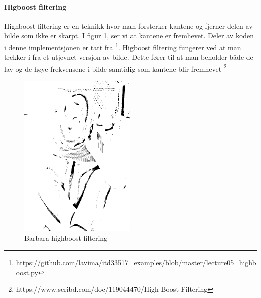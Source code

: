 \documentclass[a4paper, 12pt]{article}
\begin{document}
\paragraph{Higboost filtering}
Highboost filtering er en teknikk hvor man forsterker kantene og fjerner delen av bilde som ikke er skarpt. I figur \ref{fig:highboost-filtering}, ser vi at kantene er fremhevet. Deler av koden i denne implementsjonen er tatt fra \footnote{https://github.com/lavima/itd33517\_examples/blob/master/lecture05\_highboost.py}. Higboost filtering fungerer ved at man trekker i fra et utjevnet versjon av bilde. Dette fører til at man beholder både de lav og de høye frekvensene i bilde samtidig som kantene blir fremhevet \footnote{https://www.scribd.com/doc/119044470/High-Boost-Filtering} 

\begin{figure}[h]
  \centering
  \includegraphics[width=0.5\textwidth]{images/highboost-filtering}
  \caption{Barbara highboost filtering}
  \label{fig:highboost-filtering}
\end{figure}
\end{document}
